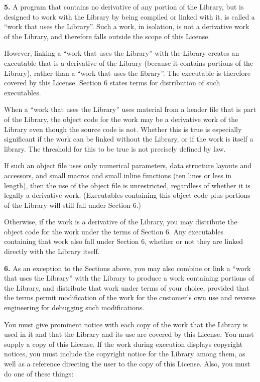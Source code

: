 \documentclass[]{article}
\begin{document}
\textbf{5.} A program that contains no derivative of any portion of the
Library, but is designed to work with the Library by being compiled or
linked with it, is called a ``work that uses the Library''. Such a work,
in isolation, is not a derivative work of the Library, and therefore
falls outside the scope of this License.

However, linking a ``work that uses the Library'' with the Library
creates an executable that is a derivative of the Library (because it
contains portions of the Library), rather than a ``work that uses the
library''. The executable is therefore covered by this License. Section
6 states terms for distribution of such executables.

When a ``work that uses the Library'' uses material from a header file
that is part of the Library, the object code for the work may be a
derivative work of the Library even though the source code is not.
Whether this is true is especially significant if the work can be linked
without the Library, or if the work is itself a library. The threshold
for this to be true is not precisely defined by law.

If such an object file uses only numerical parameters, data structure
layouts and accessors, and small macros and small inline functions (ten
lines or less in length), then the use of the object file is
unrestricted, regardless of whether it is legally a derivative work.
(Executables containing this object code plus portions of the Library
will still fall under Section 6.)

Otherwise, if the work is a derivative of the Library, you may
distribute the object code for the work under the terms of Section 6.
Any executables containing that work also fall under Section 6, whether
or not they are linked directly with the Library itself.

\textbf{6.} As an exception to the Sections above, you may also combine
or link a ``work that uses the Library'' with the Library to produce a
work containing portions of the Library, and distribute that work under
terms of your choice, provided that the terms permit modification of the
work for the customer's own use and reverse engineering for debugging
such modifications.

You must give prominent notice with each copy of the work that the
Library is used in it and that the Library and its use are covered by
this License. You must supply a copy of this License. If the work during
execution displays copyright notices, you must include the copyright
notice for the Library among them, as well as a reference directing the
user to the copy of this License. Also, you must do one of these things:
\end{document}
